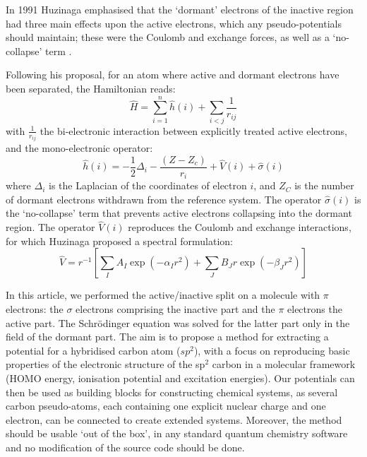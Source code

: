 \documentclass[12pt]{article}
\begin{document}
In 1991 Huzinaga emphasised that the `dormant' electrons of the inactive region had three main effects upon the active electrons, which any pseudo-potentials should maintain; these were the Coulomb and exchange forces, as well as a `no-collapse' term \cite{huzinaga_effective_1991}.

Following his proposal, for an atom where active and dormant electrons have been separated, the Hamiltonian reads:
\begin{equation}
\label{eq:atomicHamiltonian}
\hat{H} = \sum_{i=1}^n \hat{h}(i) +\sum_{i<j}\frac{1}{r_{ij}}
\end{equation}
with $\frac{1}{r_{ij}}$ the bi-electronic interaction
between explicitly treated active electrons, and
the mono-electronic operator:
\begin{equation}
\label{eq:monoElectronicOperator}
\hat{h}(i) = -\frac{1}{2}\Delta_i - \frac{(Z-Z_c)}{r_i}+\hat{V}(i) + \hat{\sigma}(i)
\end{equation}
where $\Delta_i$ is the Laplacian of the coordinates of electron $i$, and 
$Z_C$ is the number of dormant electrons withdrawn from the reference system.
The operator $\hat{\sigma}(i)$ is the `no-collapse' term that prevents active electrons
collapsing into the dormant region. The operator $\hat{V}(i)$ reproduces the 
Coulomb and exchange interactions, for which Huzinaga proposed a spectral formulation:
\begin{equation}
\label{eq:HuzinagaMPVersion1Potential}
\hat{V} = r^{-1}\left[\sum_IA_I\exp(-\alpha_I r^2)+\sum_JB_Jr\exp(-\beta_J r^2)\right]
\end{equation}

In this article, we performed the active/inactive split on a molecule with $\pi$ electrons: the $\sigma$ electrons comprising the inactive part and the $\pi$ electrons the active part.
The Schr\"odinger equation was solved for the latter part only in the field of the dormant part.
The aim is to propose a method for extracting a potential for a hybridised carbon atom 
($sp^2$), with a focus on reproducing basic properties of the electronic structure of the sp$^2$ carbon in a molecular framework 
(HOMO energy, ionisation potential and excitation energies). Our potentials can then be used as 
building blocks for constructing chemical systems, as several carbon pseudo-atoms,
each containing one explicit nuclear charge and one electron, can be connected to create extended
systems.
Moreover, the method should be usable `out of the box', in any standard quantum chemistry software
and no modification of the source code should be done.
\end{document}
